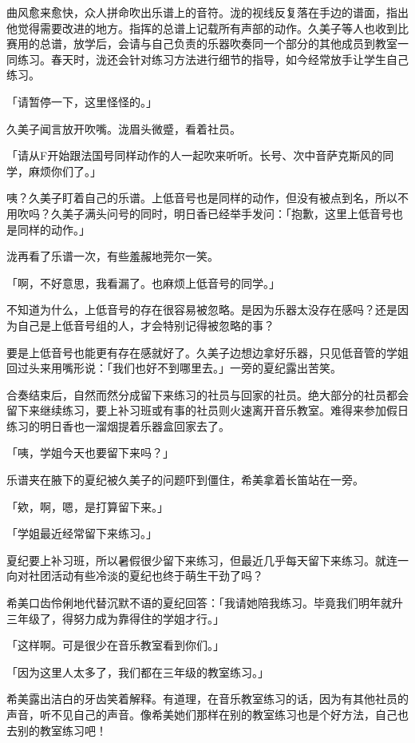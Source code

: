\documentclass[UTF8]{ctexart}
\begin{document}
    曲风愈来愈快，众人拼命吹出乐谱上的音符。泷的视线反复落在手边的谱面，指出他觉得需要改进的地方。指挥的总谱上记载所有声部的动作。久美子等人也收到比赛用的总谱，放学后，会请与自己负责的乐器吹奏同一个部分的其他成员到教室一同练习。春天时，泷还会针对练习方法进行细节的指导，如今经常放手让学生自己练习。 

    「请暂停一下，这里怪怪的。」 

    久美子闻言放开吹嘴。泷眉头微蹙，看着社员。 

    「请从F开始跟法国号同样动作的人一起吹来听听。长号、次中音萨克斯风的同学，麻烦你们了。」 

    咦？久美子盯着自己的乐谱。上低音号也是同样的动作，但没有被点到名，所以不用吹吗？久美子满头问号的同时，明日香已经举手发问：「抱歉，这里上低音号也是同样的动作。」 

    泷再看了乐谱一次，有些羞赧地莞尔一笑。 

    「啊，不好意思，我看漏了。也麻烦上低音号的同学。」 

    不知道为什么，上低音号的存在很容易被忽略。是因为乐器太没存在感吗？还是因为自己是上低音号组的人，才会特别记得被忽略的事？ 

    要是上低音号也能更有存在感就好了。久美子边想边拿好乐器，只见低音管的学姐回过头来用嘴形说：「我们也好不到哪里去。」一旁的夏纪露出苦笑。 

    合奏结束后，自然而然分成留下来练习的社员与回家的社员。绝大部分的社员都会留下来继续练习，要上补习班或有事的社员则火速离开音乐教室。难得来参加假日练习的明日香也一溜烟提着乐器盒回家去了。 

    「咦，学姐今天也要留下来吗？」 

    乐谱夹在腋下的夏纪被久美子的问题吓到僵住，希美拿着长笛站在一旁。 

    「欸，啊，嗯，是打算留下来。」 

    「学姐最近经常留下来练习。」 

    夏纪要上补习班，所以暑假很少留下来练习，但最近几乎每天留下来练习。就连一向对社团活动有些冷淡的夏纪也终于萌生干劲了吗？ 

    希美口齿伶俐地代替沉默不语的夏纪回答：「我请她陪我练习。毕竟我们明年就升三年级了，得努力成为靠得住的学姐才行。」 

    「这样啊。可是很少在音乐教室看到你们。」 

    「因为这里人太多了，我们都在三年级的教室练习。」 

    希美露出洁白的牙齿笑着解释。有道理，在音乐教室练习的话，因为有其他社员的声音，听不见自己的声音。像希美她们那样在别的教室练习也是个好方法，自己也去别的教室练习吧！ 
\end{document}
